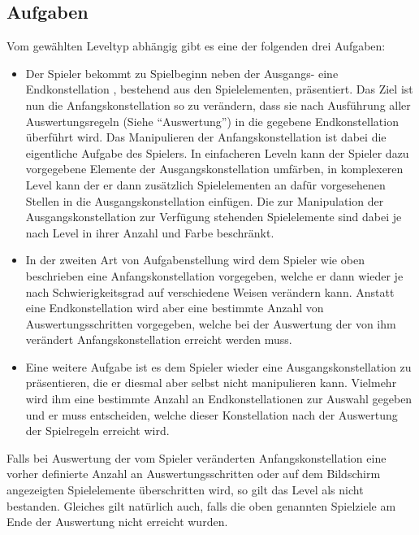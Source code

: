 \subsection{Aufgaben}
Vom gewählten Leveltyp abhängig gibt es eine der folgenden drei Aufgaben:
        \begin{itemize}
                \item Der Spieler bekommt zu Spielbeginn neben der Ausgangs- eine Endkonstellation , bestehend aus den Spielelementen, präsentiert.
                Das Ziel ist nun die Anfangskonstellation so zu verändern, dass sie nach Ausführung aller Auswertungsregeln (Siehe "`Auswertung"') in die gegebene Endkonstellation überführt wird.
                Das Manipulieren der Anfangskonstellation ist dabei die eigentliche Aufgabe des Spielers.
                In einfacheren Leveln kann der Spieler dazu vorgegebene Elemente der Ausgangskonstellation umfärben, in komplexeren Level kann der er dann zusätzlich Spielelementen an dafür vorgesehenen Stellen in die Ausgangskonstellation einfügen. 
                Die zur Manipulation der Ausgangskonstellation zur Verfügung stehenden Spielelemente sind dabei je nach Level in ihrer Anzahl und Farbe beschränkt.

                \item In der zweiten Art von Aufgabenstellung wird dem Spieler wie oben beschrieben eine Anfangskonstellation vorgegeben, welche er dann wieder je nach Schwierigkeitsgrad auf verschiedene Weisen verändern kann.
                Anstatt eine Endkonstellation wird aber eine bestimmte Anzahl von Auswertungsschritten vorgegeben, welche bei der Auswertung der von ihm verändert Anfangskonstellation erreicht werden muss.

                \item Eine weitere Aufgabe ist es dem Spieler wieder eine Ausgangskonstellation zu präsentieren, die er diesmal aber selbst nicht manipulieren kann. 
                Vielmehr wird ihm eine bestimmte Anzahl an Endkonstellationen zur Auswahl gegeben und er muss entscheiden, welche dieser Konstellation nach der Auswertung der Spielregeln erreicht wird.

        \end{itemize}

        Falls bei Auswertung der vom Spieler veränderten Anfangskonstellation eine vorher definierte Anzahl an Auswertungsschritten oder auf dem Bildschirm angezeigten Spielelemente überschritten wird, so gilt das Level als nicht bestanden. 
        Gleiches gilt natürlich auch, falls die oben genannten Spielziele am Ende der Auswertung nicht erreicht wurden.
        
